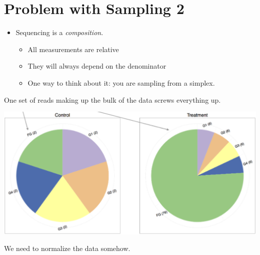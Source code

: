 \documentclass[10pt]{article}
\begin{document}
\section*{Problem with Sampling 2}
\begin{itemize}
    \item Sequencing is a \textit{composition}.
    \begin{itemize}
        \item All measurements are relative
        \item They will always depend on the denominator
        \item One way to think about it: you are sampling from a simplex.
    \end{itemize}
\end{itemize}
One set of reads making up the bulk of the data screws everything up.
\begin{center}
    \includegraphics*[scale=0.6]{W3_9.png}
\end{center}
We need to normalize the data somehow.
\end{document}
